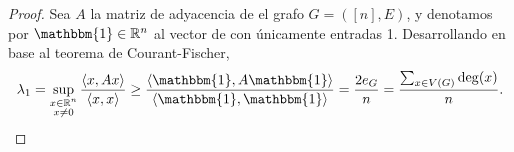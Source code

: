 \documentclass{article}[14pts]
\begin{document}
\begin{proof}
    Sea $A$ la matriz de adyacencia de el grafo $G = ([n], E)$, y denotamos por $\mathbbm{1}\in \mathbb{R}^{n}$ al vector de con únicamente entradas 1. Desarrollando en base al teorema de Courant-Fischer,
    \begin{equation*}
        \lambda_1 = \sup_{\substack{x\in \mathbb{R}^{n} \\ x\not= 0}} \frac{\langle x, Ax\rangle}{\langle x, x\rangle}
        \geq \frac{\langle \mathbbm{1}, A\mathbbm{1} \rangle}{\langle \mathbbm{1}, \mathbbm{1} \rangle}
        = \frac{2e_G}{n}\\
        = \dfrac{\sum_{x\in V(G)} \deg(x)}{n}.
   \end{equation*}
\end{proof}
\end{document}
